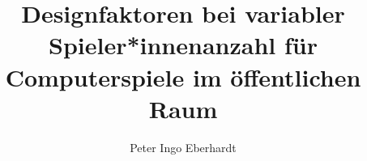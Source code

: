\documentclass[type=bachelor,theme=default,language=german,smartquotes,proposal]{hgbthesis}
\begin{document}


\title{Designfaktoren bei variabler Spieler*innenanzahl für Computerspiele im öffentlichen Raum}
\author{Peter Ingo Eberhardt}




\frontmatter                                       %

\maketitle
\tableofcontents

		
			

\mainmatter                             %



\MakeBibliography                                           %

\end{document}
